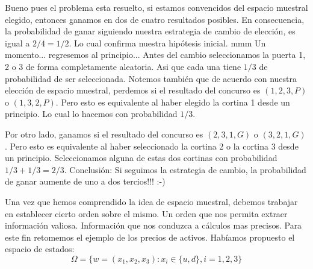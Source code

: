 \documentclass[14pt]{extreport}
\begin{document}
Bueno pues el problema esta resuelto, si estamos
convencidos del espacio muestral elegido, entonces ganamos en dos de cuatro resultados posibles. En consecuencia, la probabilidad de ganar siguiendo nuestra estrategia de cambio de elección, es igual a $2/4 = 1/2$. Lo cual confirma nuestra hipótesis inicial. mmm Un momento... regresemos al principio... Antes del cambio seleccionamos la puerta 1, 2 o 3 de forma completamente aleatoria. Asi que cada una tiene $1/3$ de probabilidad de ser seleccionada. Notemos también que de acuerdo con
nuestra elección de espacio muestral, perdemos si el resultado del concurso es $(1, 2, 3, P)$ o $(1, 3, 2, P)$. Pero esto es equivalente al haber elegido la cortina 1 desde un principio. Lo cual lo hacemos con
probabilidad $1/3$.

Por otro lado, ganamos si el resultado del concurso es
$(2, 3, 1, G )$ o $(3, 2, 1, G )$. Pero esto es equivalente al haber seleccionado la cortina 2 o la cortina 3 desde un principio.
Seleccionamos alguna de estas dos cortinas con probabilidad $1/3 + 1/3 = 2/3$. Conclusión: Si seguimos la estrategia de cambio, la probabilidad de ganar aumente de uno a dos tercios!!! :-)

\noindent\hrulefill

Una vez que hemos comprendido la idea de espacio muestral,
debemos trabajar en establecer cierto orden sobre el mismo. Un orden que
nos permita extraer información valiosa. Información que nos conduzca a
cálculos mas precisos. Para este fin retomemos el ejemplo de los precios
de activos. Habíamos propuesto el espacio de estados: 
$$
\Omega = \{w = (x_1, x_2, x_3 ) : x_i \in \{u, d\}, i = 1, 2, 3\} 
$$
\end{document}
